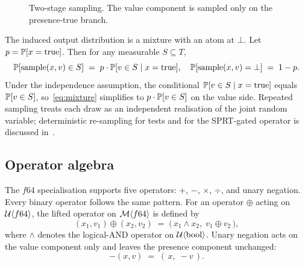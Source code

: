 \begin{figure}[h]
\centering
{}
\caption{Two-stage sampling. The value component is sampled only on the
presence-true branch.}
\label{alg:sample}
\end{figure}

The induced output distribution is a mixture with an atom at $\bot$. Let
$p = \mathbb{P}[x = \text{true}]$. Then for any measurable $S \subseteq T$,
\begin{equation}
\mathbb{P}[\mathrm{sample}(x, v) \in S] \;=\; p \cdot \mathbb{P}[v \in S \mid x = \text{true}],
\quad \mathbb{P}[\mathrm{sample}(x, v) = \bot] \;=\; 1 - p.
\label{eq:mixture}
\end{equation}
Under the independence assumption, the conditional $\mathbb{P}[v \in S \mid x =
\text{true}]$ equals $\mathbb{P}[v \in S]$, so~\eqref{eq:mixture} simplifies to
$p \cdot \mathbb{P}[v \in S]$ on the value side. Repeated sampling treats each
draw as an independent realisation of the joint random variable;
deterministic re-sampling for tests and for the SPRT-gated operator is
discussed in~.

\subsection{Operator algebra}
\label{sec:type:algebra}

The $f64$ specialisation supports five operators: $+$, $-$, $\times$,
$\div$, and unary negation. Every binary operator follows the same pattern.
For an operator $\oplus$ acting on $\mathcal{U}\langle f64 \rangle$, the lifted
operator on $\mathcal{M}\langle f64 \rangle$ is defined by
\begin{equation}
(x_1, v_1) \oplus (x_2, v_2) \;=\; \bigl(\,x_1 \wedge x_2,\; v_1 \oplus v_2\,\bigr),
\label{eq:algebra}
\end{equation}
where $\wedge$ denotes the logical-AND operator on
$\mathcal{U}\langle \mathrm{bool} \rangle$. Unary negation acts on the value component
only and leaves the presence component unchanged:
\begin{equation}
-(x, v) \;=\; (\,x,\; -v\,).
\label{eq:neg}
\end{equation}

